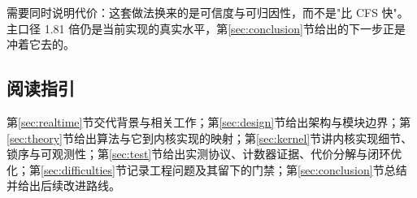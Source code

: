 需要同时说明代价：这套做法换来的是可信度与可归因性，而不是"比 CFS 快"。主口径 1.81 倍仍是当前实现的真实水平，第\ref{sec:conclusion}节给出的下一步正是冲着它去的。

\subsection{阅读指引}

第\ref{sec:realtime}节交代背景与相关工作；第\ref{sec:design}节给出架构与模块边界；第\ref{sec:theory}节给出算法与它到内核实现的映射；第\ref{sec:kernel}节讲内核实现细节、锁序与可观测性；第\ref{sec:test}节给出实测协议、计数器证据、代价分解与闭环优化；第\ref{sec:difficulties}节记录工程问题及其留下的门禁；第\ref{sec:conclusion}节总结并给出后续改进路线。